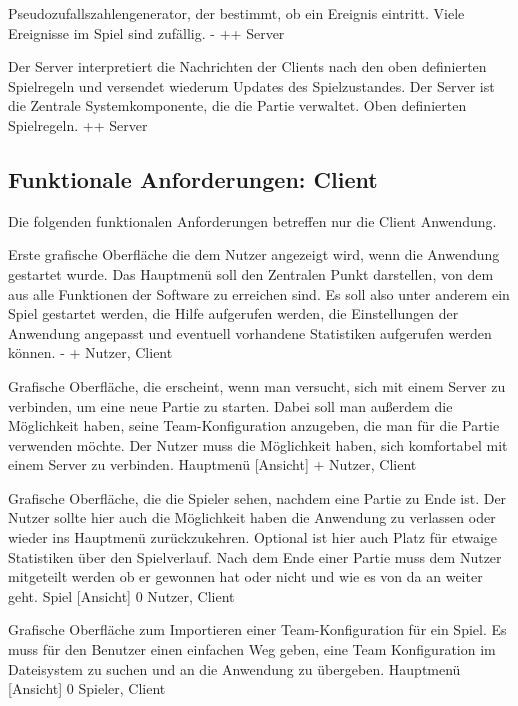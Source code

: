         {Pseudozufallszahlengenerator, der bestimmt, ob ein Ereignis eintritt.}
        {Viele Ereignisse im Spiel sind zufällig.}
        {-}
        {++}
        {Server}
        
        {Der Server interpretiert die Nachrichten der Clients nach den oben definierten Spielregeln und versendet wiederum Updates des Spielzustandes.}
        {Der Server ist die Zentrale Systemkomponente, die die Partie verwaltet.}
        {Oben definierten Spielregeln.}
        {++}
        {Server}
        

\subsection{Funktionale Anforderungen: Client}

Die folgenden funktionalen Anforderungen betreffen nur die Client Anwendung.

        {Erste grafische Oberfläche die dem Nutzer angezeigt wird, wenn die Anwendung gestartet wurde.}
        {Das Hauptmenü soll den Zentralen Punkt darstellen, von dem aus alle Funktionen der Software zu erreichen sind. Es soll also unter anderem ein Spiel gestartet werden, die Hilfe aufgerufen werden, die Einstellungen der Anwendung angepasst und eventuell vorhandene Statistiken aufgerufen werden können.}
        {-}
        {+}
        {Nutzer, Client}

        {Grafische Oberfläche, die erscheint, wenn man versucht, sich mit einem Server zu verbinden, um eine neue Partie zu starten. Dabei soll man außerdem die Möglichkeit haben, seine Team-Konfiguration anzugeben, die man für die Partie verwenden möchte.}
        {Der Nutzer muss die Möglichkeit haben, sich komfortabel mit einem Server zu verbinden.}
        {Hauptmenü [Ansicht]}
        {+}
        {Nutzer, Client}

        {Grafische Oberfläche, die die Spieler sehen, nachdem eine Partie zu Ende ist. Der Nutzer sollte hier auch die Möglichkeit haben die Anwendung zu verlassen oder wieder ins Hauptmenü zurückzukehren. Optional ist hier auch Platz für etwaige Statistiken über den Spielverlauf.}
        {Nach dem Ende einer Partie muss dem Nutzer mitgeteilt werden ob er gewonnen hat oder nicht und wie es von da an weiter geht.}
        {Spiel [Ansicht]}
        {0}
        {Nutzer, Client}
        
        {Grafische Oberfläche zum Importieren einer Team-Konfiguration für ein Spiel.}
        {Es muss für den Benutzer einen einfachen Weg geben, eine Team Konfiguration im Dateisystem zu suchen und an die Anwendung zu übergeben.}
        {Hauptmenü [Ansicht]}
        {0}
        {Spieler, Client}
        
